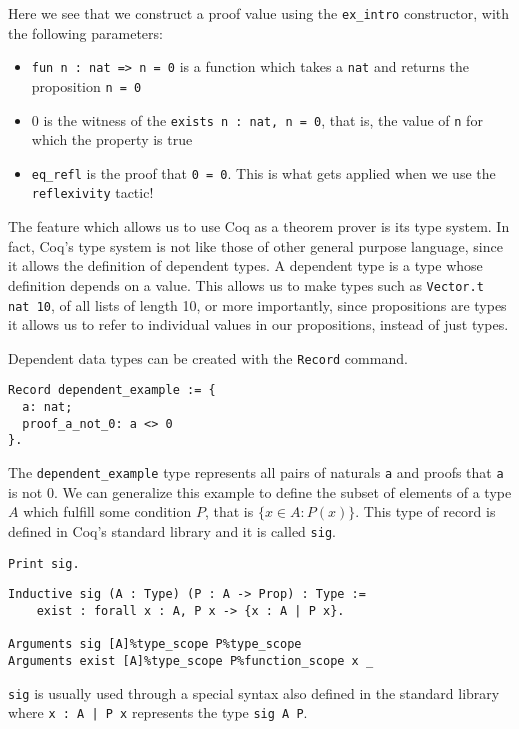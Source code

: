 Here we see that we construct a proof value using the \texttt{ex_intro} constructor, with the
following parameters:
\begin{itemize}
    \item \texttt{fun n : nat => n = 0} is a function which takes a \texttt{nat} and returns the proposition \texttt{n = 0}
    \item 0 is the witness of the \texttt{exists n : nat, n = 0}, that is, the value of \texttt{n} for which the property is true
    \item \texttt{eq_refl} is the proof that \texttt{0 = 0}. This is what gets applied when we use the \texttt{reflexivity} tactic!
\end{itemize}

The feature which allows us to use Coq as a theorem prover is its type system. In fact, Coq's type system
is not like those of other general purpose language, since it allows the definition of dependent types. A
dependent type is a type whose definition depends on a value. This allows us to make types such as 
\texttt{Vector.t nat 10}, of all lists of length 10, or more importantly, since propositions are
types it allows us to refer to individual values in our propositions, instead of just types.

Dependent data types can be created with the \texttt{Record} command.
\begin{verbatim}
Record dependent_example := {
  a: nat;
  proof_a_not_0: a <> 0
}.
\end{verbatim}
The \texttt{dependent_example} type represents all pairs of naturals 
\texttt{a} and
proofs that \texttt{a} is not 0. We can generalize this example to define the subset of 
elements of a type $A$ which fulfill some condition $P$, that is $\{x \in A : P (x)\}$. This type of record is defined in Coq's standard
library and it is called \texttt{sig}.

\begin{verbatim}
Print sig.
\end{verbatim}
\vspace{-\baselineskip*3/2}
\begin{verbatim}
Inductive sig (A : Type) (P : A -> Prop) : Type :=
    exist : forall x : A, P x -> {x : A | P x}.

Arguments sig [A]%type_scope P%type_scope
Arguments exist [A]%type_scope P%function_scope x _
\end{verbatim}
\noindent \texttt{sig} is usually used through a special syntax also defined in the standard library
where \texttt{{x : A | P x}} represents the type \texttt{sig A P}.


